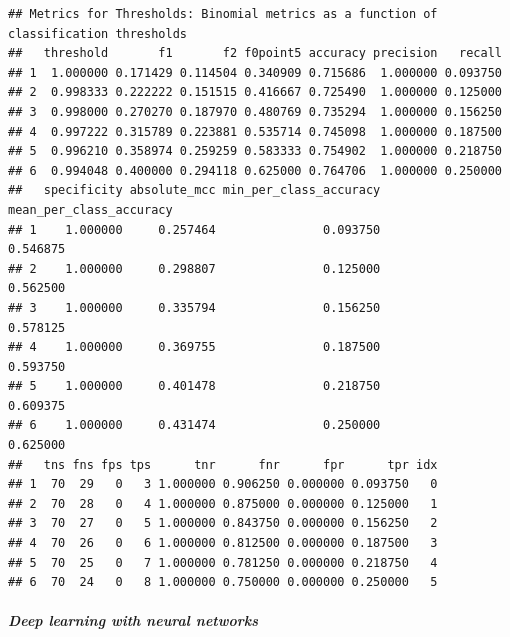 \documentclass[]{article}
\let\oldsubparagraph\subparagraph
\renewcommand{\subparagraph}[1]{\oldsubparagraph{#1}\mbox{}}
\begin{document}
\begin{verbatim}
## Metrics for Thresholds: Binomial metrics as a function of classification thresholds
##   threshold       f1       f2 f0point5 accuracy precision   recall
## 1  1.000000 0.171429 0.114504 0.340909 0.715686  1.000000 0.093750
## 2  0.998333 0.222222 0.151515 0.416667 0.725490  1.000000 0.125000
## 3  0.998000 0.270270 0.187970 0.480769 0.735294  1.000000 0.156250
## 4  0.997222 0.315789 0.223881 0.535714 0.745098  1.000000 0.187500
## 5  0.996210 0.358974 0.259259 0.583333 0.754902  1.000000 0.218750
## 6  0.994048 0.400000 0.294118 0.625000 0.764706  1.000000 0.250000
##   specificity absolute_mcc min_per_class_accuracy mean_per_class_accuracy
## 1    1.000000     0.257464               0.093750                0.546875
## 2    1.000000     0.298807               0.125000                0.562500
## 3    1.000000     0.335794               0.156250                0.578125
## 4    1.000000     0.369755               0.187500                0.593750
## 5    1.000000     0.401478               0.218750                0.609375
## 6    1.000000     0.431474               0.250000                0.625000
##   tns fns fps tps      tnr      fnr      fpr      tpr idx
## 1  70  29   0   3 1.000000 0.906250 0.000000 0.093750   0
## 2  70  28   0   4 1.000000 0.875000 0.000000 0.125000   1
## 3  70  27   0   5 1.000000 0.843750 0.000000 0.156250   2
## 4  70  26   0   6 1.000000 0.812500 0.000000 0.187500   3
## 5  70  25   0   7 1.000000 0.781250 0.000000 0.218750   4
## 6  70  24   0   8 1.000000 0.750000 0.000000 0.250000   5
\end{verbatim}

\subparagraph{Deep learning with neural
networks}\label{deep-learning-with-neural-networks}
\end{document}
